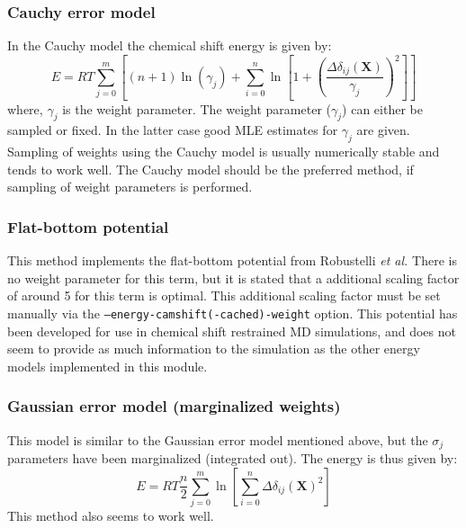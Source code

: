 \subsubsection{Cauchy error model}
In the Cauchy model the chemical shift energy is given by:
\begin{equation}
    E = RT \sum_{j=0}^{m} \left[(n+1) \ln{ \left(\gamma_j \right)} 
    + \sum_{i=0}^{n} \ln{\left[ 1 + \left(\frac{\Delta\delta_{ij}(\mathbf X)}{\gamma_j} \right)^2\right]}\right]
\end{equation}
where, $\gamma_j$ is the weight parameter.
The weight parameter ($\gamma_j$) can either be sampled or fixed.
In the latter case good MLE estimates for $\gamma_j$ are given.
Sampling of weights using the Cauchy model is usually numerically stable and tends to work well.
The Cauchy model should be the preferred method, if sampling of weight parameters is performed.

\subsubsection{Flat-bottom potential}
This method implements the flat-bottom potential from Robustelli \textit{et al.}\cite{CSMD} 
There is no weight parameter for this term, but it is stated that a additional scaling factor of around 5 for this term is optimal. 
This additional scaling factor must be set manually via the \texttt{--energy-camshift(-cached)-weight} option. 
This potential has been developed for use in chemical shift restrained MD simulations, and does not seem to provide as much information to the simulation as the other energy models implemented in this module.

\subsubsection{Gaussian error model (marginalized weights)}
This model is similar to the Gaussian error model mentioned above, but the $\sigma_j$ parameters have been marginalized (integrated out). The energy is thus given by:
\begin{equation}
    E = RT \frac{n}{2} \sum_{j=0}^{m} \ln{\left[\sum_{i=0}^{n} \Delta\delta_{ij}(\mathbf X)^2\right]}
\end{equation}
This method also seems to work well.

\begin{optiontable}
\end{optiontable}
